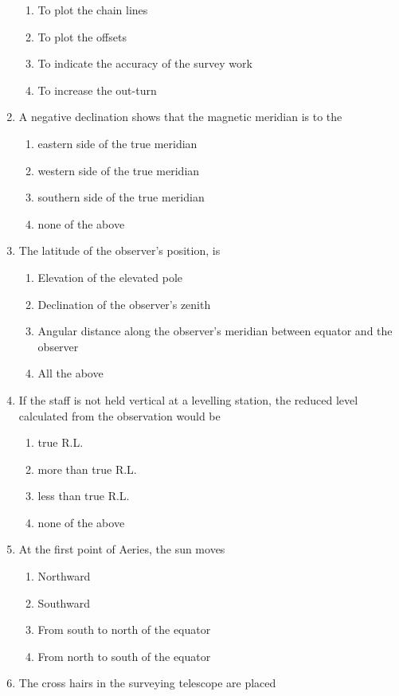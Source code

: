 \documentclass[11pt,a4paper]{article}
\begin{document}
\begin{enumerate}
\begin{enumerate}[label=\Alph*.]
\item{To plot the chain lines}
\item{To plot the offsets}
\item{To indicate the accuracy of the survey work}
\item{To increase the out-turn}
\end{enumerate}
\item{A negative declination shows that the magnetic meridian is to the}
\begin{enumerate}[label=\Alph*.]
\item{eastern side of the true meridian}
\item{western side of the true meridian}
\item{southern side of the true meridian}
\item{none of the above}
\end{enumerate}
\item{The latitude of the observer's position, is}
\begin{enumerate}[label=\Alph*.]
\item{Elevation of the elevated pole}
\item{Declination of the observer's zenith}
\item{Angular distance along the observer's meridian between equator and the observer}
\item{All the above}
\end{enumerate}
\item{If the staff is not held vertical at a levelling station, the reduced level calculated from the observation would be
}
\begin{enumerate}[label=\Alph*.]
\item{true R.L.}
\item{more than true R.L.}
\item{less than true R.L.}
\item{none of the above}
\end{enumerate}
\item{At the first point of Aeries, the sun moves}
\begin{enumerate}[label=\Alph*.]
\item{Northward}
\item{Southward}
\item{From south to north of the equator}
\item{From north to south of the equator}
\end{enumerate}
\item{The cross hairs in the surveying telescope are placed}

\end{enumerate}
\end{document}
